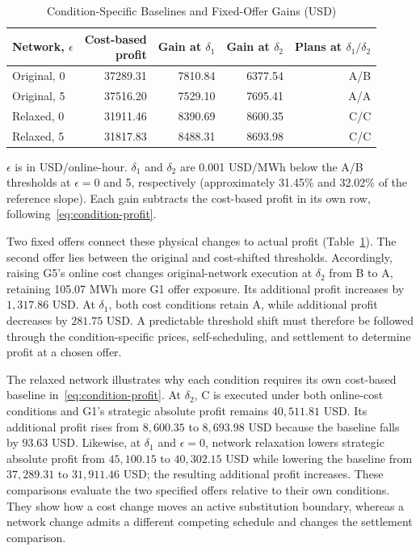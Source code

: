 \documentclass[journal]{IEEEtran}
\begin{document}
\begin{table}[t]
\centering\caption{Condition-Specific Baselines and Fixed-Offer Gains (USD)}\label{tab:factorial}
\setlength{\tabcolsep}{3pt}
\begin{tabular}{@{}lrrrr@{}}\toprule
\shortstack{Network,\\$\epsilon$} & \shortstack{Cost-based\\profit} & \shortstack{Gain at\\$\delta_1$} & \shortstack{Gain at\\$\delta_2$} & \shortstack{Plans at\\$\delta_1/\delta_2$}\\\midrule
Original, 0 & 37289.31 & 7810.84 & 6377.54 & A/B\\
Original, 5 & 37516.20 & 7529.10 & 7695.41 & A/A\\
Relaxed, 0 & 31911.46 & 8390.69 & 8600.35 & C/C\\
Relaxed, 5 & 31817.83 & 8488.31 & 8693.98 & C/C\\
\bottomrule\end{tabular}
\vspace{2pt}\parbox{\columnwidth}{\footnotesize $\epsilon$ is in USD/online-hour. $\delta_1$ and $\delta_2$ are 0.001 USD/MWh below the A/B thresholds at $\epsilon=0$ and 5, respectively (approximately 31.45\% and 32.02\% of the reference slope). Each gain subtracts the cost-based profit in its own row, following~\eqref{eq:condition-profit}.}
\end{table}

Two fixed offers connect these physical changes to actual profit (Table~\ref{tab:factorial}). The second offer lies between the original and cost-shifted thresholds. Accordingly, raising G5's online cost changes original-network execution at $\delta_2$ from B to A, retaining 105.07 MWh more G1 offer exposure. Its additional profit increases by $1{,}317.86$ USD. At $\delta_1$, both cost conditions retain A, while additional profit decreases by $281.75$ USD. A predictable threshold shift must therefore be followed through the condition-specific prices, self-scheduling, and settlement to determine profit at a chosen offer.

The relaxed network illustrates why each condition requires its own cost-based baseline in~\eqref{eq:condition-profit}. At $\delta_2$, C is executed under both online-cost conditions and G1's strategic absolute profit remains $40{,}511.81$ USD. Its additional profit rises from $8{,}600.35$ to $8{,}693.98$ USD because the baseline falls by $93.63$ USD. Likewise, at $\delta_1$ and $\epsilon=0$, network relaxation lowers strategic absolute profit from $45{,}100.15$ to $40{,}302.15$ USD while lowering the baseline from $37{,}289.31$ to $31{,}911.46$ USD; the resulting additional profit increases. These comparisons evaluate the two specified offers relative to their own conditions. They show how a cost change moves an active substitution boundary, whereas a network change admits a different competing schedule and changes the settlement comparison.
\end{document}
